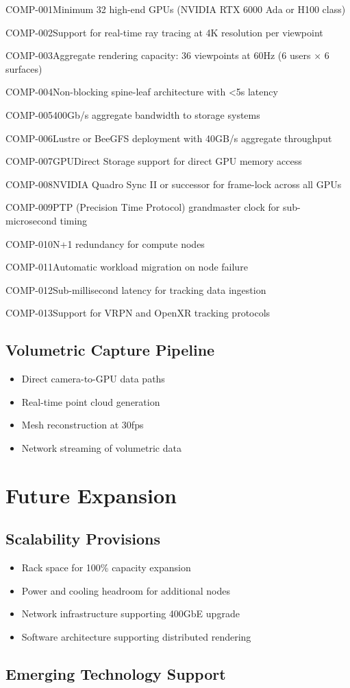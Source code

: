\begin{requirement}{COMP-001}{Minimum 32 high-end GPUs (NVIDIA RTX 6000 Ada or H100 class)}
\begin{requirement}{COMP-002}{Support for real-time ray tracing at 4K resolution per viewpoint}
\begin{requirement}{COMP-003}{Aggregate rendering capacity: 36 viewpoints at 60Hz (6 users × 6 surfaces)}
\begin{requirement}{COMP-004}{Non-blocking spine-leaf architecture with <5\textmu s latency}
\begin{requirement}{COMP-005}{400Gb/s aggregate bandwidth to storage systems}
\begin{requirement}{COMP-006}{Lustre or BeeGFS deployment with 40GB/s aggregate throughput}
\begin{requirement}{COMP-007}{GPUDirect Storage support for direct GPU memory access}
\begin{requirement}{COMP-008}{NVIDIA Quadro Sync II or successor for frame-lock across all GPUs}
\begin{requirement}{COMP-009}{PTP (Precision Time Protocol) grandmaster clock for sub-microsecond timing}
\begin{requirement}{COMP-010}{N+1 redundancy for compute nodes}
\begin{requirement}{COMP-011}{Automatic workload migration on node failure}
\begin{requirement}{COMP-012}{Sub-millisecond latency for tracking data ingestion}
\begin{requirement}{COMP-013}{Support for VRPN and OpenXR tracking protocols}
\subsection{Volumetric Capture Pipeline}

\begin{itemize}
    \item Direct camera-to-GPU data paths
    \item Real-time point cloud generation
    \item Mesh reconstruction at 30fps
    \item Network streaming of volumetric data
\end{itemize}

\section{Future Expansion}

\subsection{Scalability Provisions}

\begin{itemize}
    \item Rack space for 100\% capacity expansion
    \item Power and cooling headroom for additional nodes
    \item Network infrastructure supporting 400GbE upgrade
    \item Software architecture supporting distributed rendering
\end{itemize}

\subsection{Emerging Technology Support}


\end{requirement}
\end{requirement}
\end{requirement}
\end{requirement}
\end{requirement}
\end{requirement}
\end{requirement}
\end{requirement}
\end{requirement}
\end{requirement}
\end{requirement}
\end{requirement}
\end{requirement}
